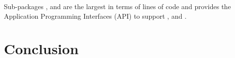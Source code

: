 Sub-packages ,  and  are the
largest in terms of lines of code and provides the Application Programming
Interfaces (API) to support ,  and
.

\section{Conclusion}

%
%
%
%
